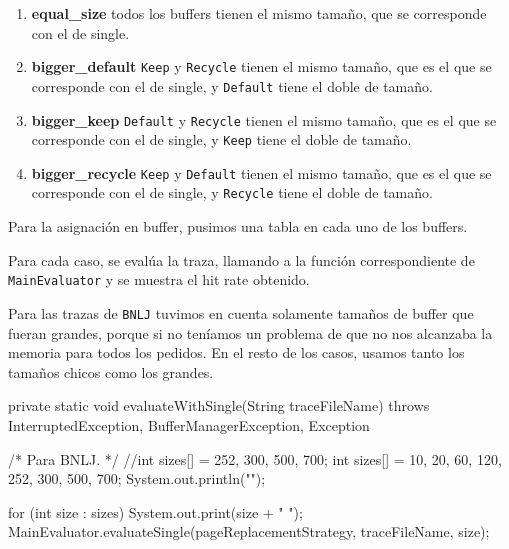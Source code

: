 \begin{enumerate}
	\item
		\textbf{equal\_size}
		todos los buffers tienen el mismo tamaño, que se corresponde
		con el de single.
		
	\item
		\textbf{bigger\_default}
		\texttt{Keep} y \texttt{Recycle} tienen el mismo tamaño, 
		que es el que se corresponde con el de single, y 
		\texttt{Default} tiene el doble de tamaño.

	\item
		\textbf{bigger\_keep}
		\texttt{Default} y \texttt{Recycle} tienen el mismo tamaño, 
		que es el que se corresponde con el de single, y 
		\texttt{Keep} tiene el doble de tamaño.

	\item
		\textbf{bigger\_recycle}
		\texttt{Keep} y \texttt{Default} tienen el mismo tamaño, 
		que es el que se corresponde con el de single, y 
		\texttt{Recycle} tiene el doble de tamaño.
\end{enumerate}

Para la asignación en buffer, pusimos una tabla en cada uno de los
buffers.

\vspace*{0.5cm}

Para cada caso, se evalúa la traza, llamando a la función correspondiente
de \texttt{MainEvaluator} y se muestra el hit rate obtenido.

\vspace*{0.5cm}

Para las trazas de \texttt{BNLJ} tuvimos en cuenta solamente tamaños
de buffer que fueran grandes, porque si no teníamos un problema de
que no nos alcanzaba la memoria para todos los pedidos.
En el resto de los casos, usamos tanto los tamaños chicos como los
grandes.

\begin{verbatimtab}[4]
private static void evaluateWithSingle(String traceFileName) 
	throws InterruptedException, BufferManagerException, Exception
{
	/* Para BNLJ. */ //int sizes[] = {252, 300, 500, 700}; 
	int sizes[] = {10, 20, 60, 120, 252, 300, 500, 700};
	System.out.println("\nSingleBufferPool\n");
	
	for (int size : sizes)
	{		
		System.out.print(size + " ");
		MainEvaluator.evaluateSingle(pageReplacementStrategy, traceFileName, size);			
	}
}
\end{verbatimtab}

